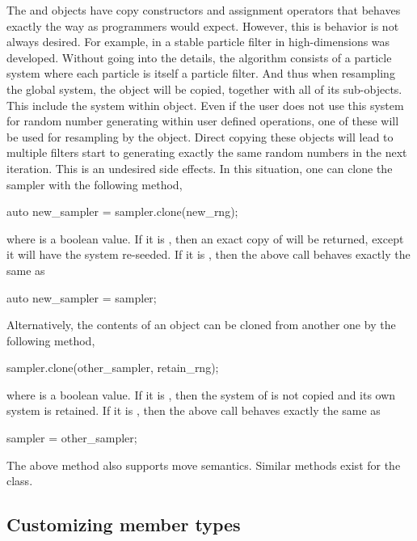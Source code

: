\documentclass[11pt,bib,mint,hyper,altcolor]{marticle}
\begin{document}
The  and  objects have copy
constructors and assignment operators that behaves exactly the way as \cpp
programmers would expect. However, this is behavior is not always desired. For
example, in \textcite{stpf} a stable particle filter in high-dimensions was
developed. Without going into the details, the algorithm consists of a particle
system where each particle is itself a particle filter. And thus when
resampling the global system, the  object will be copied,
together with all of its sub-objects. This include the \rng system within
 object. Even if the user does not use this \rng system
for random number generating within user defined operations, one of these \rng
will be used for resampling by the  object. Direct
copying these  objects will lead to multiple filters
start to generating exactly the same random numbers in the next iteration. This
is an undesired side effects. In this situation, one can clone the sampler with
the following method,
\begin{cppcode}
  auto new_sampler = sampler.clone(new_rng);
\end{cppcode}
where  is a boolean value. If it is , then
an exact copy of  will be returned, except it will have the
\rng system re-seeded. If it is , then the above call behaves
exactly the same as
\begin{cppcode}
  auto new_sampler = sampler;
\end{cppcode}
Alternatively, the contents of an  object can be cloned
from another one by
the following method,
\begin{cppcode}
  sampler.clone(other_sampler, retain_rng);
\end{cppcode}
where  is a boolean value. If it is ,
then the \rng system of  is not copied and its own
\rng system is retained. If it is , then the above call
behaves exactly the same as
\begin{cppcode}
  sampler = other_sampler;
\end{cppcode}
The above method also supports move semantics. Similar 
methods exist for the  class.

\subsection{Customizing member types}
\label{sub:Customizing member types}
\end{document}
